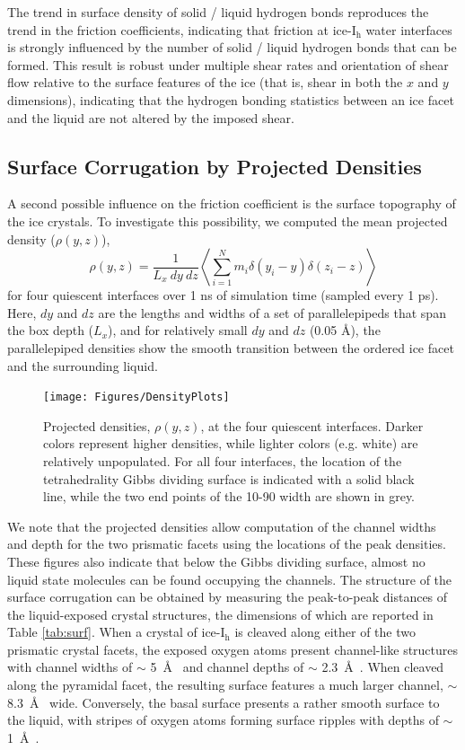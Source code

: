 The trend in surface density of solid / liquid hydrogen bonds
reproduces the trend in the friction coefficients, indicating that
friction at ice-I$_\mathrm{h}$ water interfaces is strongly influenced
by the number of solid / liquid hydrogen bonds that can be formed.
This result is robust under multiple shear rates and orientation of
shear flow relative to the surface features of the ice (that is, shear
in both the $x$ and $y$ dimensions), indicating that the hydrogen
bonding statistics between an ice facet and the liquid are not altered
by the imposed shear.

\subsection{Surface Corrugation by Projected Densities}
A second possible influence on the friction coefficient is the surface
topography of the ice crystals. To investigate this possibility, we
computed the mean projected density ($\rho(y,z)$),
\begin{equation}
\rho(y, z) = \frac{1}{L_x~dy~dz} \left< \sum_{i = 1}^{N} m_i \delta(y_i - y) \delta(z_i - z)\right>
\end{equation}
for four quiescent interfaces over 1 ns of simulation time (sampled
every 1 ps).  Here, $dy$ and $dz$ are the lengths and widths of a set of
parallelepipeds that span the box depth ($L_x$), and for relatively
small $dy$ and $dz$ (0.05 \AA), the parallelepiped densities show the
smooth transition between the ordered ice facet and the surrounding
liquid.

\begin{figure}
\texttt{[image: Figures/DensityPlots]}
\caption{\label{fig:DensPlots} Projected densities, $\rho(y, z)$, at
  the four quiescent interfaces.  Darker colors represent higher
  densities, while lighter colors (e.g. white) are relatively
  unpopulated.  For all four interfaces, the location of the
  tetrahedrality Gibbs dividing surface is indicated with a solid
  black line, while the two end points of the 10-90 width are shown in
  grey.}
\end{figure}

We note that the projected densities allow computation of the channel
widths and depth for the two prismatic facets using the locations of
the peak densities.  These figures also indicate that below the Gibbs
dividing surface, almost no liquid state molecules can be found
occupying the channels.  The structure of the surface corrugation can
be obtained by measuring the peak-to-peak distances of the
liquid-exposed crystal structures, the dimensions of which are
reported in Table \ref{tab:surf}. When a crystal of ice-I$_\mathrm{h}$
is cleaved along either of the two prismatic crystal facets, the
exposed oxygen atoms present channel-like structures with channel
widths of $\sim$ 5~\AA~ and channel depths of $\sim$ 2.3~\AA~.  When
cleaved along the pyramidal facet, the resulting surface features a
much larger channel, $\sim$ 8.3~\AA~ wide.  Conversely, the basal
surface presents a rather smooth surface to the liquid, with stripes
of oxygen atoms forming surface ripples with depths of $\sim$ 1~\AA~.

